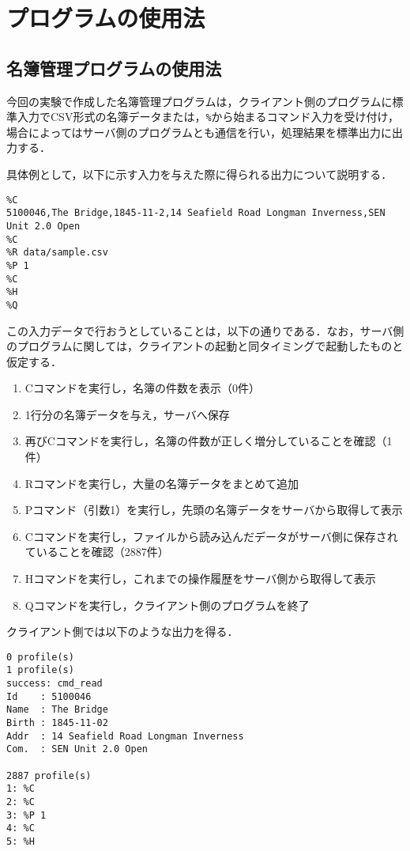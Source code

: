\documentclass[11pt]{jsarticle}
\begin{document}
\section{プログラムの使用法}

\subsection{名簿管理プログラムの使用法}

今回の実験で作成した名簿管理プログラムは，クライアント側のプログラムに標準入力でCSV形式の名簿データまたは，{\tt \%}から始まるコマンド入力を受け付け，場合によってはサーバ側のプログラムとも通信を行い，処理結果を標準出力に出力する．

具体例として，以下に示す入力を与えた際に得られる出力について説明する．

{\small
\begin{verbatim}
%C
5100046,The Bridge,1845-11-2,14 Seafield Road Longman Inverness,SEN Unit 2.0 Open
%C
%R data/sample.csv
%P 1
%C
%H
%Q
\end{verbatim}
}

この入力データで行おうとしていることは，以下の通りである．なお，サーバ側のプログラムに関しては，クライアントの起動と同タイミングで起動したものと仮定する．

\begin{enumerate}
      \item Cコマンドを実行し，名簿の件数を表示（0件）
      \item 1行分の名簿データを与え，サーバへ保存
      \item 再びCコマンドを実行し，名簿の件数が正しく増分していることを確認（1件）
      \item Rコマンドを実行し，大量の名簿データをまとめて追加
      \item Pコマンド（引数1）を実行し，先頭の名簿データをサーバから取得して表示
      \item Cコマンドを実行し，ファイルから読み込んだデータがサーバ側に保存されていることを確認（2887件）
      \item Hコマンドを実行し，これまでの操作履歴をサーバ側から取得して表示
      \item Qコマンドを実行し，クライアント側のプログラムを終了
\end{enumerate}

クライアント側では以下のような出力を得る．

\begin{verbatim}
0 profile(s)
1 profile(s)
success: cmd_read
Id    : 5100046
Name  : The Bridge
Birth : 1845-11-02
Addr  : 14 Seafield Road Longman Inverness
Com.  : SEN Unit 2.0 Open

2887 profile(s)
1: %C
2: %C
3: %P 1
4: %C
5: %H
\end{verbatim}
\end{document}
